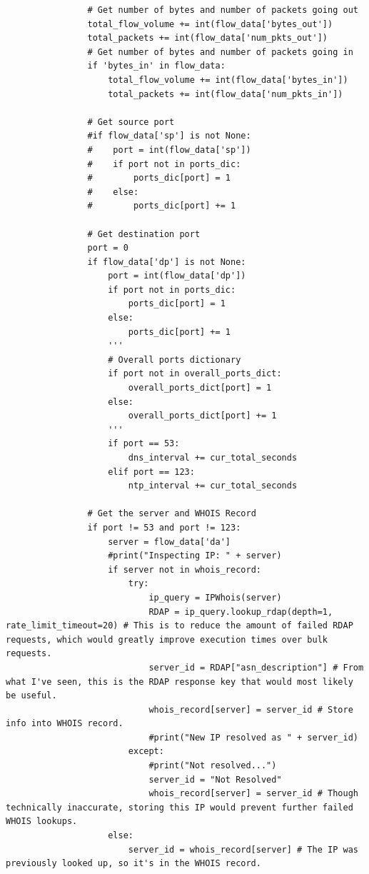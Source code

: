 \documentclass{article}
\begin{document}
\begin{appendices}
\begin{verbatim}
                # Get number of bytes and number of packets going out
                total_flow_volume += int(flow_data['bytes_out'])
                total_packets += int(flow_data['num_pkts_out'])
                # Get number of bytes and number of packets going in
                if 'bytes_in' in flow_data:
                    total_flow_volume += int(flow_data['bytes_in'])
                    total_packets += int(flow_data['num_pkts_in'])
            
                # Get source port
                #if flow_data['sp'] is not None:
                #    port = int(flow_data['sp'])
                #    if port not in ports_dic:
                #        ports_dic[port] = 1
                #    else:
                #        ports_dic[port] += 1

                # Get destination port
                port = 0
                if flow_data['dp'] is not None:
                    port = int(flow_data['dp'])
                    if port not in ports_dic:
                        ports_dic[port] = 1
                    else:
                        ports_dic[port] += 1
                    '''
                    # Overall ports dictionary
                    if port not in overall_ports_dict:
                        overall_ports_dict[port] = 1
                    else:
                        overall_ports_dict[port] += 1
                    '''
                    if port == 53:
                        dns_interval += cur_total_seconds
                    elif port == 123:
                        ntp_interval += cur_total_seconds

                # Get the server and WHOIS Record
                if port != 53 and port != 123:
                    server = flow_data['da']
                    #print("Inspecting IP: " + server)
                    if server not in whois_record:
                        try:
                            ip_query = IPWhois(server)
                            RDAP = ip_query.lookup_rdap(depth=1, rate_limit_timeout=20) # This is to reduce the amount of failed RDAP requests, which would greatly improve execution times over bulk requests.
                            server_id = RDAP["asn_description"] # From what I've seen, this is the RDAP response key that would most likely be useful.
                            whois_record[server] = server_id # Store info into WHOIS record.
                            #print("New IP resolved as " + server_id)
                        except:
                            #print("Not resolved...")
                            server_id = "Not Resolved"
                            whois_record[server] = server_id # Though technically inaccurate, storing this IP would prevent further failed WHOIS lookups.
                    else:
                        server_id = whois_record[server] # The IP was previously looked up, so it's in the WHOIS record.


\end{verbatim}
\end{appendices}
\end{document}
